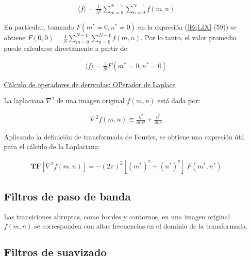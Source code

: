 \begin{eqnarray}
	\langle f \rangle = \frac{1}{N^2} \sum _{m=0}^{N-1} \sum _{n=0}^{N-1} f(m, n)
\label{EqLXIII}
\end{eqnarray}

En particular, tomando $F(m^*=0, n^*=0)$ en la expresi\'on (\ref{EqLIX} (59)) se obtiene $ F(0, 0)= \frac{1}{N} \sum _{m=0}^{N-1} \sum _{n=0}^{N-1} f(m, n)$.
%
Por lo tanto, el valor promedio puede calcularse directamente a partir de:

\begin{eqnarray}
	\langle f \rangle = \frac{1}{N} F(m^* = 0, n^* = 0)
\label{EqLXIV}
\end{eqnarray}

\vspace{1.0cm}

\underline{C\'alculo de operadores de derivadas: OPerador de Laplace}

\vspace{0.5cm}

La laplaciana $\nabla^2$ de una imagen original $f(m, n)$ est\'a dada por:

\begin{eqnarray}
	\nabla^2 f(m, n) \equiv \frac{\partial^2}{\partial m^2} + \frac{\partial^2}{\partial n^2}
\label{EqLXV}
\end{eqnarray}

Aplicando la definici\'on de transformada de Fourier, se obtiene una expresi\'on \'util para el c\'alculo de la Laplaciana:

\begin{eqnarray}
	\mathbf{TF}[ \nabla^2 f(m, n) ] = -(2 \pi)^2 \left[ (m^*) ^2 + (n^*) ^2 \right] \; F(m^*, n^*)
\label{EqLXVI}
\end{eqnarray}









\subsection{Filtros de paso de banda}

Las transiciones abruptas, como bordes y contornos, en una imagen original $f(m, n)$ se corresponden con altas frecuencias en el dominio de la
transformada.
%

\subsection{Filtros de suavizado}

